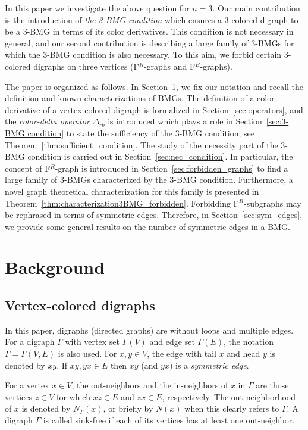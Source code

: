 \documentclass[final,3p,times]{elsarticle}
\begin{document}
In this paper we investigate the above question for $n=3$. Our main contribution is the introduction of \emph{the 3-BMG condition} which ensures a 3-colored digraph to be a 3-BMG in terms of its color derivatives. This condition is not necessary in general, and our second contribution is describing a large family of 3-BMGs for which the 3-BMG condition is also necessary. To this aim, we forbid certain 3-colored digraphs on three vertices (F$^R$-graphs and F$^B$-graphs). 

The paper is organized as follows. In Section~\ref{sec:background}, we fix our notation and recall the definition and known characterizations of BMGs. The definition of a color derivative of a vertex-colored digraph is formalized in Section~\ref{sec:operators}, and the \emph{color-delta operator} $\Delta_{rb}$ is introduced which plays a role in Section~\ref{sec:3-BMG condition} to state the sufficiency of the 3-BMG condition; see Theorem~\ref{thm:sufficient_condition}. The study of the necessity part of the 3-BMG condition is carried out in Section~\ref{sec:nec_condition}. In particular, the concept of F$^R$-graph is introduced in Section~\ref{sec:forbidden_graphs} to find a large family of 3-BMGs characterized by the 3-BMG condition. Furthermore, a novel graph theoretical characterization for this family is presented in Theorem~\ref{thm:characterization3BMG_forbidden}. Forbidding F$^R$-subgraphs may be rephrased in terms of symmetric edges. Therefore, in Section~\ref{sec:sym_edges}, we provide some general results on the number of symmetric edges in a BMG.

\section{Background}
\label{sec:background}
\subsection{Vertex-colored digraphs}
In this paper, digraphs (directed graphs) are without loops and multiple edges. For a digraph $\Gamma$ with vertex set $\Gamma(V)$ and edge set $\Gamma(E)$, the notation $\Gamma=\Gamma(V,E)$ is also used. For $x,y\in V$,
the edge with tail $x$ and head $y$ is denoted by $xy$. If $xy,yx\in E$ then $xy$ (and $yx)$ is a {\emph{symmetric edge}}.

For a vertex $x\in V$, the out-neighbors and the in-neighbors of $x$ in $\Gamma$ are those vertices $z\in V$ for which $xz\in E$ and $zx\in E$, respectively. The out-neighborhood of $x$ is denoted by $N_\Gamma(x)$, or briefly by $N(x)$ when this clearly refers to $\Gamma$. A digraph $\Gamma$ is called sink-free if each of its vertices has at least one out-neighbor.
\end{document}
